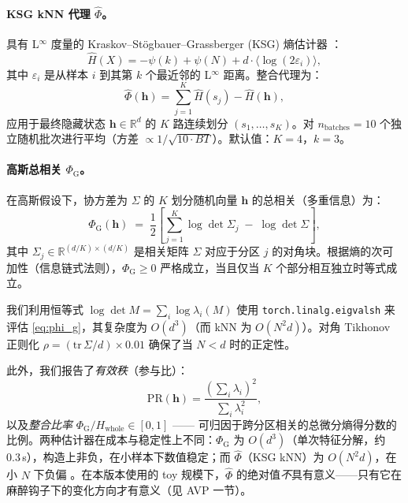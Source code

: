 \documentclass[11pt]{article}
\theoremstyle{definition}
\newcommand{\RR}{\mathbb{R}}
\newcommand{\vh}{\mathbf{h}}
\newcommand{\phihat}{\hat{\Phi}}
\newcommand{\phig}{\Phi_{\mathrm{G}}}
\begin{document}
\paragraph{KSG kNN 代理 $\phihat$。}
具有 L$^\infty$ 度量的 Kraskov--St\"ogbauer--Grassberger (KSG) 熵估计器 \citep{kraskov2004estimating}：
\begin{equation}
  \hat{H}(X) = -\psi(k) + \psi(N) + d\cdot\langle\log(2\varepsilon_i)\rangle,
\end{equation}
其中 $\varepsilon_i$ 是从样本 $i$ 到其第 $k$ 个最近邻的 L$^\infty$ 距离。整合代理为：
\begin{equation}
  \phihat(\vh) = \sum_{j=1}^{K}\hat{H}(s_j) - \hat{H}(\vh),
  \label{eq:phi_hat}
\end{equation}
应用于最终隐藏状态 $\vh\in\RR^d$ 的 $K$ 路连续划分 $(s_1,\ldots,s_K)$。对 $n_\text{batches}=10$ 个独立随机批次进行平均（方差 $\propto 1/\sqrt{10\cdot BT}$）。默认值：$K=4$，$k=3$。

\paragraph{高斯总相关 $\phig$。}
在高斯假设下，协方差为 $\Sigma$ 的 $K$ 划分随机向量 $\vh$ 的总相关（多重信息）为：
\begin{equation}
  \phig(\vh) \;=\; \frac{1}{2}\left[\sum_{j=1}^{K}\log\det\Sigma_j \;-\; \log\det\Sigma\right],
  \label{eq:phi_g}
\end{equation}
其中 $\Sigma_j\in\RR^{(d/K)\times(d/K)}$ 是相关矩阵 $\Sigma$ 对应于分区 $j$ 的对角块。根据熵的次可加性（信息链式法则），$\phig \ge 0$ 严格成立，当且仅当 $K$ 个部分相互独立时等式成立。

我们利用恒等式 $\log\det M = \sum_i\log\lambda_i(M)$ 使用 \texttt{torch.linalg.eigvalsh} 来评估 \eqref{eq:phi_g}，其复杂度为 $O(d^3)$（而 kNN 为 $O(N^2 d)$）。对角 Tikhonov 正则化 $\rho = (\mathrm{tr}\,\Sigma / d)\times 0.01$ 确保了当 $N < d$ 时的正定性。

此外，我们报告了\emph{有效秩}（参与比）：
\begin{equation}
  \mathrm{PR}(\vh) = \frac{\left(\sum_i\lambda_i\right)^2}{\sum_i\lambda_i^2},
  \label{eq:pr}
\end{equation}
以及\emph{整合比率} $\phig / H_\text{whole} \in [0,1]$ —— 可归因于跨分区相关的总微分熵得分数的比例。两种估计器在成本与稳定性上不同：$\phig$ 为 $O(d^3)$（单次特征分解，约 0.3\,s），构造上非负，在小样本下数值稳定；而 $\phihat$（KSG kNN）为 $O(N^2 d)$，在小 $N$ 下负偏 \citep{lord2018geometric}。在本版本使用的 toy 规模下，$\hat{\Phi}$ 的绝对值\emph{不}具有意义——只有它在麻醉钩子下的变化方向才有意义（见 AVP 一节）。
\end{document}
